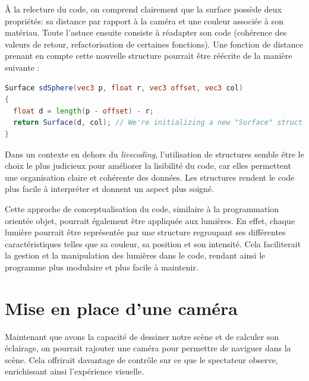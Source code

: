 À la relecture du code, on comprend clairement que la surface possède deux propriétés: sa distance par rapport à la caméra et une couleur associée à son matériau. Toute l'astuce ensuite consiste à réadapter son code (cohérence des valeurs de retour, refactorisation de certaines fonctions). Une fonction de distance prenant en compte cette nouvelle structure pourrait être réécrite de la manière suivante :

\begin{minipage}{\linewidth}
\begin{lstlisting}[language=GLSL, caption=Refactorisation d'une SDF,captionpos=b,frame=single] 
Surface sdSphere(vec3 p, float r, vec3 offset, vec3 col)
{
  float d = length(p - offset) - r;
  return Surface(d, col); // We're initializing a new "Surface" struct here and then returning it
}
\end{lstlisting}
\end{minipage}

Dans un contexte en dehors du  \textit{livecoding}, l'utilisation de structures semble être le choix le plus judicieux pour améliorer la lisibilité du code, car elles permettent une organisation claire et cohérente des données. Les structures rendent le code plus facile à interpréter et donnent un aspect plus soigné.

Cette approche de conceptualisation du code, similaire à la programmation orientée objet, pourrait également être appliquée aux lumières. En effet, chaque lumière pourrait être représentée par une structure regroupant ses différentes caractéristiques telles que sa couleur, sa position et son intensité. Cela faciliterait la gestion et la manipulation des lumières dans le code, rendant ainsi le programme plus modulaire et plus facile à maintenir.


\newpage
\section{Mise en place d'une caméra}
Maintenant que avons la capacité de dessiner notre scène et de calculer son éclairage, on pourrait rajouter une caméra pour permettre de naviguer dans la scène. Cela offrirait davantage de contrôle sur ce que le spectateur observe, enrichissant ainsi l'expérience visuelle.

